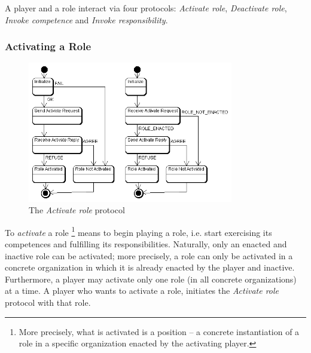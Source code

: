 A player and a role interact via four protocols: \textit{Activate role}, \textit{Deactivate role}, \textit{Invoke competence} and \textit{Invoke responsibility}.

\subsubsection{Activating a Role}
\label{section:activating-a-role}

\begin{figure}[ht]
	\centering
	\includegraphics[width=0.8\textwidth]{images/thespian/activate-role-protocol.png}
	\caption{The \textit{Activate role} protocol}
	\label{figure:thespian-activate-role-protocol}
\end{figure}

To \textit{activate} a role
\footnote{More precisely, what is activated is a position -- a concrete instantiation of a role in a specific organization enacted by the activating player.}
means to begin playing a role, i.e. start exercising its competences and fulfilling its responsibilities.
Naturally, only an enacted and inactive role can be activated; more precisely, a role can only be activated in a concrete organization in which it is already enacted by the player and inactive.
Furthermore, a player may activate only one role (in all concrete organizations) at a time.
A player who wants to activate a role, initiates the \textit{Activate role} protocol with that role.

